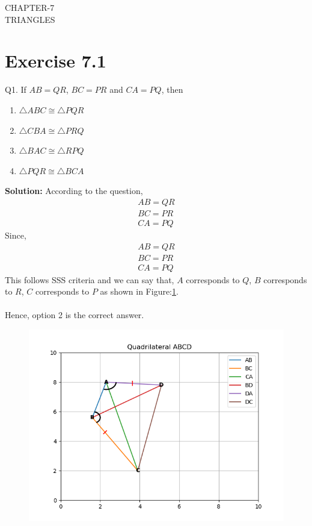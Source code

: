 \documentclass{article}
\newcommand{\solution}{\noindent \textbf{Solution: }}
\begin{document}
\begin{center}
	\textbf\large{CHAPTER-7 \\ TRIANGLES}
\end{center}
\section{Exercise 7.1}
Q1. If $AB = QR$, $BC = PR$ and $CA = PQ$, then 
\begin{enumerate}
	\item  $\triangle{ABC} \cong \triangle{PQR}$
	\item  $\triangle{CBA} \cong \triangle{PRQ}$
	\item  $\triangle{BAC} \cong \triangle{RPQ}$
	\item  $\triangle{PQR} \cong \triangle{BCA}$
\end{enumerate}
\solution
According to the question,
\begin{align}
	AB = QR\\
	BC = PR\\
	CA =PQ
\end{align}
Since,
\begin{align}
	AB = QR\\
	BC = PR\\
	CA = PQ
\end{align}
This follows SSS criteria and we can say that, $A$ corresponds to $Q$, $B$ corresponds to $R$, $C$ corresponds to $P$ as shown in Figure:\ref{fig:Fig}.\\ \\
Hence, option 2 is the correct answer.
\begin{figure}[h]
	\begin{center}
		\includegraphics[width=\columnwidth]{figs/graph.png}
	\end{center}
	\caption{}
	\label{fig:Fig}
\end{figure}
\end{document}
